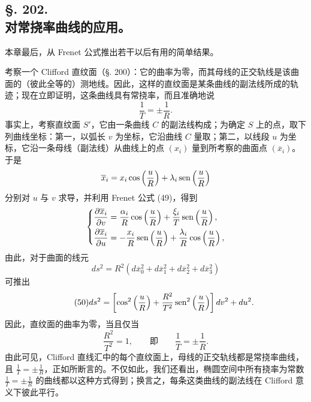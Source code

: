 \subsection*{§. 202.\\ 对常挠率曲线的应用。}

本章最后，从 Frenet 公式推出若干以后有用的简单结果。

考察一个 Clifford 直纹面（§. 200）：它的曲率为零，而其母线的正交轨线是该曲面的（彼此全等的）测地线。因此，这样的直纹面是某条曲线的副法线所成的轨迹；现在立即证明，这条曲线具有常挠率，而且准确地说
\[
 \frac1T=\pm\frac1R.
\]
事实上，考察直纹面 \(S'\)，它由一条曲线 \(C\) 的副法线构成；为确定 \(S\) 上的点，取下列曲线坐标：第一，以弧长 \(v\) 为坐标，它沿曲线 \(C\) 量取；第二，以线段 \(u\) 为坐标，它沿一条母线（副法线）从曲线上的点 \((x_i)\) 量到所考察的曲面点 \((\overline{x}_i)\)。于是
\[
 \overline{x}_i=x_i\cos\left(\frac uR\right)+\lambda_i\operatorname{sen}\left(\frac uR\right)
\]
分别对 \(u\) 与 \(v\) 求导，并利用 Frenet 公式 (49)，得到
\[
\left\{
\begin{aligned}
\frac{\partial\overline{x}_i}{\partial v}
&=\frac{\alpha_i}{R}\cos\left(\frac uR\right)+\frac{\xi_i}{T}\operatorname{sen}\left(\frac uR\right),\\
\frac{\partial\overline{x}_i}{\partial u}
&=-\frac{x_i}{R}\operatorname{sen}\left(\frac uR\right)+\frac{\lambda_i}{R}\cos\left(\frac uR\right),
\end{aligned}\right.
\]
由此，对于曲面的线元
\[
 ds^2=R^2(d\overline{x}_0^2+d\overline{x}_1^2+d\overline{x}_2^2+d\overline{x}_3^2)
\]
可推出
\[
\tag{50}
 ds^2=\left[\cos^2\left(\frac uR\right)+\frac{R^2}{T^2}\operatorname{sen}^2\left(\frac uR\right)\right]dv^2+du^2.
\]
因此，直纹面的曲率为零，当且仅当
\[
 \frac{R^2}{T^2}=1,
 \qquad \text{即}\qquad \frac1T=\pm\frac1R.
\]
由此可见，Clifford 直线汇中的每个直纹面上，母线的正交轨线都是常挠率曲线，且 \(\frac1T=\pm\frac1R\)，正如所断言的。不仅如此，我们还看出，椭圆空间中所有挠率为常数 \(\frac1T=\pm\frac1R\) 的曲线都以这种方式得到；换言之，每条这类曲线的副法线在 Clifford 意义下彼此平行。

